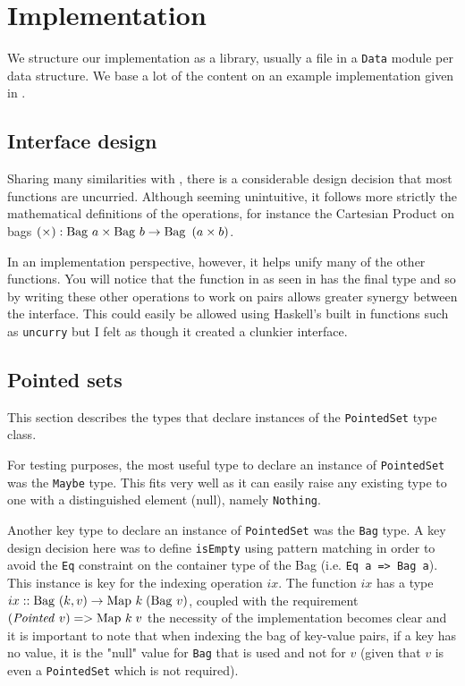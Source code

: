 \section{Implementation}
We structure our implementation as a library, usually a file in a \texttt{Data}
module per data structure. We base a lot of the content on an example
implementation given in
\cite{RelationalAlgebraByWayOfAdjunctionsPrototypeImplementation}.

\subsection{Interface design}
Sharing many similarities with \cite{RelationalAlgebraByWayOfAdjunctions}, there
is a considerable design decision that most functions are uncurried. Although
seeming unintuitive, it follows more strictly the mathematical definitions of
the operations, for instance the Cartesian Product on bags $(\times): \mathrm{Bag}\ a
\times \mathrm{Bag}\ b \to \mathrm{Bag}\ \left(a \times b\right)$.

In an implementation perspective, however, it helps unify many of the other
functions. You will notice that the  function in
\cite{RelationalAlgebraByWayOfAdjunctions} as seen in 
 has the final type  and so by writing these other operations to work on pairs allows
greater synergy between the interface. This could easily be allowed using
Haskell's built in functions\cite{Prelude} such as \texttt{uncurry} but I felt
as though it created a clunkier interface.

\subsection{Pointed sets}
This section describes the types that declare instances of the
\texttt{PointedSet} type class.

For testing purposes, the most useful type to declare an instance of
\texttt{PointedSet} was the \texttt{Maybe} type. This fits very well as it can
easily raise any existing type to one with a distinguished element (null),
namely \texttt{Nothing}.

Another key type to declare an instance of \texttt{PointedSet} was the
\texttt{Bag} type. A key design decision here was to define \texttt{isEmpty}
using pattern matching in order to avoid the \texttt{Eq} constraint on the
container type of the Bag (i.e. \texttt{Eq a => Bag a}). This instance is key
for the indexing operation $ix$. The function $ix$ has a type $ix ::
\mathrm{Bag}\ (k, v) \to \mathrm{Map}\ k\;(\mathrm{Bag}\ v)$, coupled with the requirement $(\mathit{Pointed}\ v)
=> \mathrm{Map}\ k\;v$ the necessity of the implementation becomes clear and it is
important to note that when indexing the bag of key-value pairs, if a key has no
value, it is the "null" value for \texttt{Bag} that is used and not for $v$
(given that $v$ is even a \texttt{PointedSet} which is not required).

